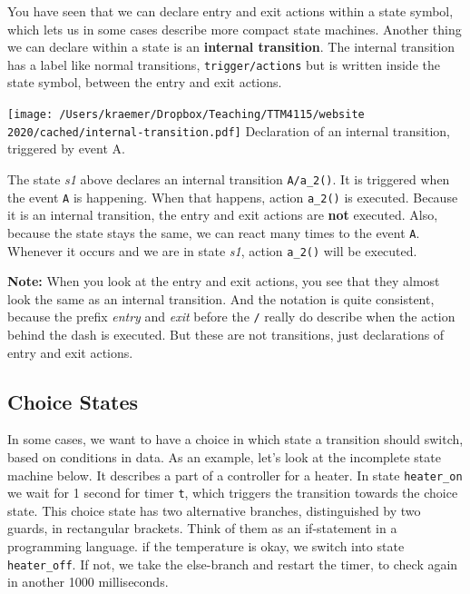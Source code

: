 \documentclass[10pt, twoside, twocolumn]{book}
\renewcommand{\caption}{}
\let\origfigure=\figure
\let\endorigfigure=\endfigure
\renewenvironment{figure}[1][]{%
  \origfigure[H]
}{%
  \endorigfigure
}
\begin{document}
You have seen that we can declare entry and exit actions within a state
symbol, which lets us in some cases describe more compact state
machines. Another thing we can declare within a state is an
\textbf{internal transition}. The internal transition has a label like
normal transitions, \texttt{trigger/actions} but is written inside the
state symbol, between the entry and exit actions.

\begin{figure}[htbp]
\begin{center}
\texttt{[image: /Users/kraemer/Dropbox/Teaching/TTM4115/website 2020/cached/internal-transition.pdf]}%
\caption{Declaration of an internal transition, triggered by event A.}
\label{default}
\end{center}
\end{figure}
The state \emph{s1} above declares an internal transition
\texttt{A/a\_2()}. It is triggered when the event \texttt{A} is
happening. When that happens, action \texttt{a\_2()} is executed.
Because it is an internal transition, the entry and exit actions are
\textbf{not} executed. Also, because the state stays the same, we can
react many times to the event \texttt{A}. Whenever it occurs and we are
in state \emph{s1}, action \texttt{a\_2()} will be executed.

\textbf{Note:} When you look at the entry and exit actions, you see that
they almost look the same as an internal transition. And the notation is
quite consistent, because the prefix \emph{entry} and \emph{exit} before
the \texttt{/} really do describe when the action behind the dash is
executed. But these are not transitions, just declarations of entry and
exit actions.

\hypertarget{choice-states}{%
\subsection{Choice States}\label{choice-states}}

In some cases, we want to have a choice in which state a transition
should switch, based on conditions in data. As an example, let's look at
the incomplete state machine below. It describes a part of a controller
for a heater. In state \texttt{heater\_on} we wait for 1 second for
timer \texttt{t}, which triggers the transition towards the choice
state. This choice state has two alternative branches, distinguished by
two guards, in rectangular brackets. Think of them as an if-statement in
a programming language. if the temperature is okay, we switch into state
\texttt{heater\_off}. If not, we take the else-branch and restart the
timer, to check again in another 1000 milliseconds.
\end{document}
